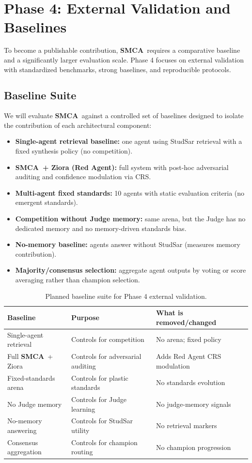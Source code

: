 \documentclass[11pt, a4paper]{article}
\newcommand{\sysname}{\textbf{SMCA}}
\begin{document}
\section{Phase 4: External Validation and Baselines}
To become a publishable contribution, \sysname\ requires a comparative baseline and a significantly larger evaluation scale. Phase 4 focuses on external validation with standardized benchmarks, strong baselines, and reproducible protocols.

\subsection{Baseline Suite}
We will evaluate \sysname\ against a controlled set of baselines designed to isolate the contribution of each architectural component:
\begin{itemize}
  \item \textbf{Single-agent retrieval baseline:} one agent using StudSar retrieval with a fixed synthesis policy (no competition).
  \item \textbf{\sysname\ + Ziora (Red Agent):} full system with post-hoc adversarial auditing and confidence modulation via CRS.
  \item \textbf{Multi-agent fixed standards:} 10 agents with static evaluation criteria (no emergent standards).
  \item \textbf{Competition without Judge memory:} same arena, but the Judge has no dedicated memory and no memory-driven standards bias.
  \item \textbf{No-memory baseline:} agents answer without StudSar (measures memory contribution).
  \item \textbf{Majority/consensus selection:} aggregate agent outputs by voting or score averaging rather than champion selection.
\end{itemize}

\begin{table}[H]
\centering
\begin{tabular}{@{}lll@{}}
\toprule
\textbf{Baseline} & \textbf{Purpose} & \textbf{What is removed/changed} \\
\midrule
Single-agent retrieval & Controls for competition & No arena; fixed policy \\
Full \sysname\ + Ziora & Controls for adversarial auditing & Adds Red Agent CRS modulation \\
Fixed-standards arena & Controls for plastic standards & No standards evolution \\
No Judge memory & Controls for Judge learning & No judge-memory signals \\
No-memory answering & Controls for StudSar utility & No retrieval markers \\
Consensus aggregation & Controls for champion routing & No champion progression \\
\bottomrule
\end{tabular}
\caption{Planned baseline suite for Phase 4 external validation.}
\label{tab:baselines}
\end{table}
\end{document}
